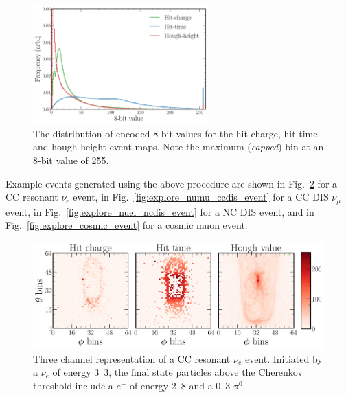 \begin{figure} %
    \includegraphics[width=0.6\textwidth]{diagrams/6-cvn/chipsnet/explore_8_bit_range.pdf}
    \caption[Event map encoded 8-bit distributions.]
    {The distribution of encoded 8-bit values for the hit-charge, hit-time and hough-height event
        maps. Note the maximum (\emph{capped}) bin at an 8-bit value of 255.}
    \label{fig:explore_8_bit_range}
\end{figure}

Example events generated using the above procedure are shown in
Fig.~\ref{fig:explore_nuel_ccres_event} for a CC resonant $\nu_{e}$ event, in
Fig.~\ref{fig:explore_numu_ccdis_event} for a CC DIS $\nu_{\mu}$ event, in
Fig.~\ref{fig:explore_nuel_ncdis_event} for a NC DIS event, and in
Fig.~\ref{fig:explore_cosmic_event} for a cosmic muon event.

\begin{figure} %
    \includegraphics[width=\textwidth]{diagrams/6-cvn/chipsnet/explore_nuel_ccres_event.pdf}
    \caption[Example of a CC resonant $\nu_{e}$ event.]
    {Three channel representation of a CC resonant $\nu_{e}$ event. Initiated by a $\nu_{e}$ of
        energy \unit{3.3}{\GeV}, the final state particles above the Cherenkov threshold include a
        $e^{-}$ of energy \unit{2.8}{\GeV} and a \unit{0.3}{\GeV} $\pi^{0}$.}
    \label{fig:explore_nuel_ccres_event}
\end{figure}


